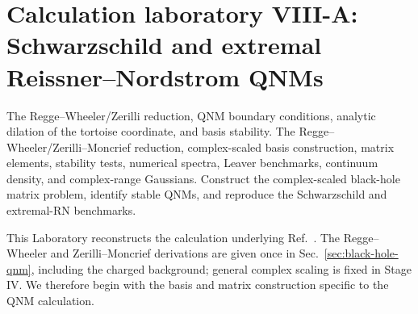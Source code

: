 \section{Calculation laboratory VIII-A: Schwarzschild and extremal Reissner--Nordstrom QNMs}
\label{lab:2604_20442}

\calculationroute
  {The Regge--Wheeler/Zerilli reduction, QNM boundary conditions, analytic dilation of the tortoise coordinate, and basis stability.}
  {The Regge--Wheeler/Zerilli--Moncrief reduction, complex-scaled basis construction, matrix elements, stability tests, numerical spectra, Leaver benchmarks, continuum density, and complex-range Gaussians.}
  {Construct the complex-scaled black-hole matrix problem, identify stable QNMs, and reproduce the Schwarzschild and extremal-RN benchmarks.}

This Laboratory reconstructs the calculation underlying
Ref.~\cite{Ogawa:2026veu}.  The Regge--Wheeler and
Zerilli--Moncrief derivations are given once in
Sec.~\ref{sec:black-hole-qnm}, including the charged background; general
complex scaling is fixed in Stage IV.  We therefore begin with the basis and
matrix construction specific to the QNM calculation.

